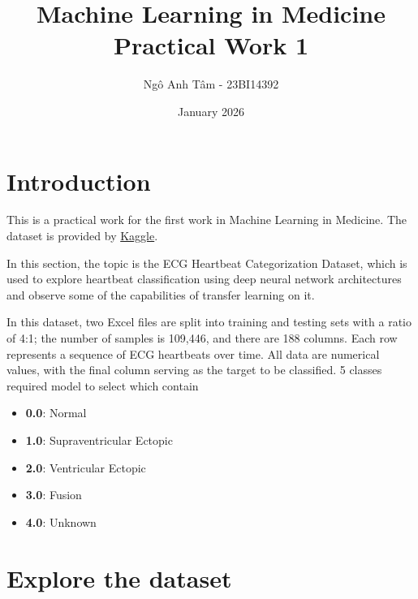 \documentclass[twocolumn]{article}
\title{Machine Learning in Medicine \\ Practical Work 1}
\author{Ngô Anh Tâm - 23BI14392}
\date{January 2026}
\begin{document}
\maketitle


\section{Introduction}
This is a practical work for the first work in Machine Learning in Medicine. The dataset is provided by \href{https://www.kaggle.com/datasets/shayanfazeli/heartbeat}{Kaggle}.

In this section, the topic is the ECG Heartbeat Categorization Dataset, which is used to explore heartbeat classification using deep neural network architectures and observe some of the capabilities of transfer learning on it.

In this dataset, two Excel files are split into training and testing sets with a ratio of 4:1; the number of samples is 109,446, and there are 188 columns. Each row represents a sequence of ECG heartbeats over time. All data are numerical values, with the final column serving as the target to be classified. 5 classes required model to select which contain 
             
\begin{itemize}
    \item \textbf{0.0}: Normal
    \item \textbf{1.0}: Supraventricular Ectopic
    \item \textbf{2.0}: Ventricular Ectopic
    \item \textbf{3.0}: Fusion
    \item \textbf{4.0}: Unknown
\end{itemize}

\section{Explore the dataset}
\end{document}

